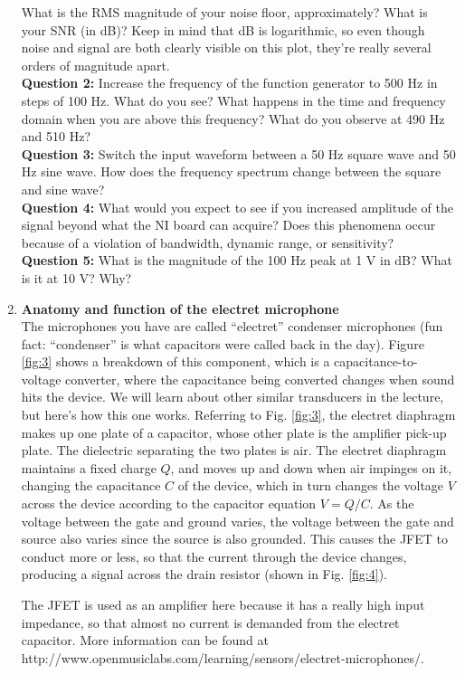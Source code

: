 \documentclass[12pt]{article}
\begin{document}
\begin{enumerate}
What is the RMS magnitude of your noise floor, approximately?
What is your SNR (in dB)?
Keep in mind that dB is logarithmic, so even though noise and signal are both clearly visible on this plot, they're really several orders of magnitude apart.\\
{\bf Question 2:} Increase the frequency of the function generator to 500 Hz in steps of 100 Hz.  
What do you see?  
What happens in the time and frequency domain when you are above this frequency?  
What do you observe at 490 Hz and 510 Hz?  \\
{\bf Question 3:} Switch the input waveform between a 50 Hz square wave and 50 Hz sine wave. 
How does the frequency spectrum change between the square and sine wave?  \\
{\bf Question 4:} What would you expect to see if you increased amplitude of the signal beyond what the NI board can acquire?  
Does this phenomena occur because of a violation of bandwidth, dynamic range, or sensitivity?\\
{\bf Question 5:} What is the magnitude of the 100 Hz peak at 1 V in dB?  What is it at 10 V?  Why?\\

\item {\bf Anatomy and function of the electret microphone}\\
The microphones you have are called ``electret'' condenser microphones (fun fact: ``condenser'' is what capacitors were called back in the day). 
Figure \ref{fig:3} shows a breakdown of this component, which is a capacitance-to-voltage converter, 
where the capacitance being converted changes when sound hits the device. 
We will learn about other similar transducers in the lecture, but here's how this one works.
Referring to Fig. \ref{fig:3}, the electret diaphragm makes up one plate of a capacitor, 
whose other plate is the amplifier pick-up plate.
The dielectric separating the two plates is air.
The electret diaphragm maintains a fixed charge $Q$, and moves up and down when air impinges on it, 
changing the capacitance $C$ of the device, which in turn changes the voltage $V$ across the device according to the capacitor equation $V = Q/C$.
As the voltage between the gate and ground varies, the voltage between the gate and source also varies since the source is also grounded. 
This causes the JFET to conduct more or less, so that the current through the device changes, producing a signal across the drain resistor (shown in Fig. \ref{fig:4}).

\par The JFET is used as an amplifier here because it has a really high input impedance, so that almost no current is demanded from the electret capacitor.
More information can be found at http://www.openmusiclabs.com/learning/sensors/electret-microphones/.


\end{enumerate}
\end{document}
